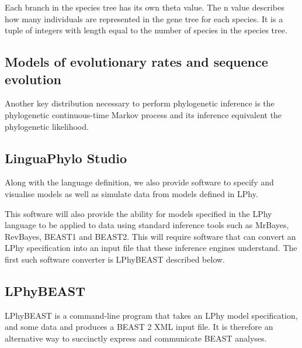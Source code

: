 \documentclass[11pt]{article}
\begin{document}
Each branch in the species tree has its own theta value. The n value describes how many individuals are represented in
the gene tree for each species. It is a tuple of integers with length equal to the number of species in the species
tree.

\subsection{Models of evolutionary rates and sequence evolution}

Another key distribution necessary to perform phylogenetic inference is the phylogenetic continuous-time Markov process and its inference equivalent the phylogenetic likelihood. 


\subsection{LinguaPhylo Studio}

Along with the language definition, we also provide software to specify and visualise models as well as simulate data from models defined in LPhy. 

This software will also provide the ability for models specified in the LPhy language to be applied to data using standard inference tools such as MrBayes, RevBayes, BEAST1 and BEAST2. This will require software that can convert an LPhy specification into an input file that these inference engines understand. The first such software converter is LPhyBEAST described below.

\subsection{LPhyBEAST}

LPhyBEAST is a command-line program that takes an LPhy model specification, and some data and produces a BEAST 2 XML input file.
It is therefore an alternative way to succinctly express and communicate BEAST analyses.
\end{document}
